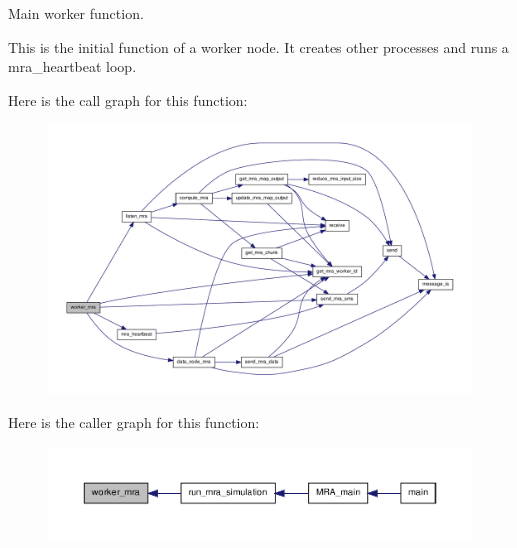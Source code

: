 \-Main worker function. 

\-This is the initial function of a worker node. \-It creates other processes and runs a mra\-\_\-heartbeat loop. 

\-Here is the call graph for this function\-:\nopagebreak
\begin{figure}[H]
\begin{center}
\leavevmode
\includegraphics[width=350pt]{simcore-mra_8c_a3f18ef8503f272839fc15596ace82344_cgraph}
\end{center}
\end{figure}




\-Here is the caller graph for this function\-:\nopagebreak
\begin{figure}[H]
\begin{center}
\leavevmode
\includegraphics[width=350pt]{simcore-mra_8c_a3f18ef8503f272839fc15596ace82344_icgraph}
\end{center}
\end{figure}


